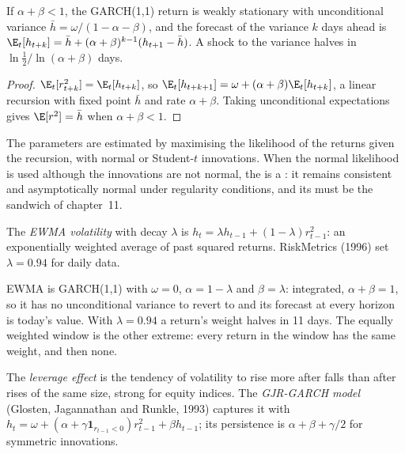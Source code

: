 \begin{proposition}\label{prop:qm:volatility-models:garch}
If $\alpha + \beta < 1$, the GARCH(1,1) return is weakly stationary with unconditional variance $\bar h = \omega/(1 - \alpha - \beta)$, and the forecast of the
variance $k$ days ahead is $\E_t[h_{t+k}] = \bar h + (\alpha + \beta)^{k-1}(h_{t+1} - \bar h)$. A shock to the variance halves in $\ln\frac12/\ln(\alpha + \beta)$
days.
\end{proposition}

\begin{proof}
$\E_t[r_{t+k}^2] = \E_t[h_{t+k}]$, so $\E_t[h_{t+k+1}] = \omega + (\alpha + \beta)\E_t[h_{t+k}]$, a linear recursion with fixed point $\bar h$ and rate $\alpha + \beta$.
Taking unconditional expectations gives $\E[r^2] = \bar h$ when $\alpha + \beta < 1$.
\end{proof}

The parameters are estimated by maximising the likelihood of the returns given the recursion, with normal or Student-$t$ innovations. When the
normal likelihood is used although the innovations are not normal, the  is a  : it remains consistent and
asymptotically normal under regularity conditions, and its  must be the sandwich of chapter~11.

\begin{definition}\label{def:qm:volatility-models:ewma}
The \emph{EWMA volatility} with decay $\lambda$ is $h_t = \lambda h_{t-1} + (1 - \lambda)r_{t-1}^2$: an exponentially weighted average of past squared
returns. RiskMetrics (1996) set $\lambda = 0.94$ for daily data.
\end{definition}

EWMA is GARCH(1,1) with $\omega = 0$, $\alpha = 1 - \lambda$ and $\beta = \lambda$: integrated, $\alpha + \beta = 1$, so it has no unconditional variance to revert to and
its forecast at every horizon is today's value. With $\lambda = 0.94$ a return's weight halves in 11 days. The equally weighted window is the other extreme:
every return in the window has the same weight, and then none.

\begin{definition}\label{def:qm:volatility-models:gjr}
The \emph{leverage effect} is the tendency of volatility to rise more after falls than after rises of the same size, strong for equity
indices. The \emph{GJR-GARCH model} (Glosten, Jagannathan and Runkle, 1993) captures it with $h_t = \omega + (\alpha + \gamma\mathbf 1_{r_{t-1} <
0})r_{t-1}^2 + \beta h_{t-1}$; its persistence is $\alpha + \beta + \gamma/2$ for symmetric innovations.
\end{definition}


